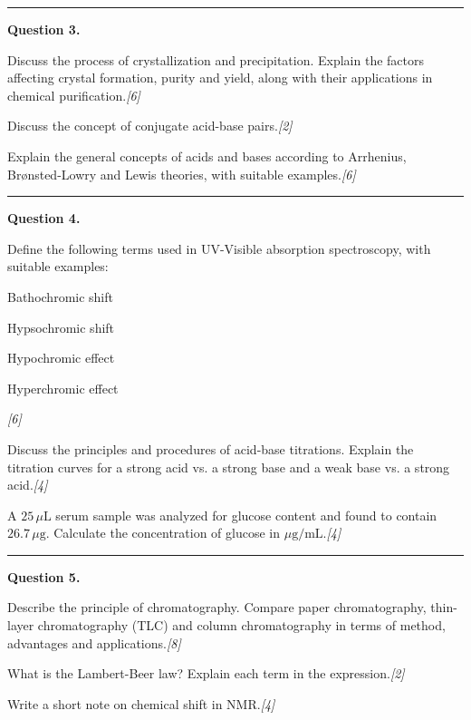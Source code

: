 \documentclass[11pt,a4paper]{article}
\newcommand{\pts}[1]{\hfill   \textit{[#1]}}
\begin{document}
\medskip\rule{\linewidth}{0.2pt}\medskip




\noindent   \textbf{Question 3.}

\begin{parts}
  \item Discuss the process of crystallization and precipitation. Explain the factors affecting crystal formation, purity and yield, along with their applications in chemical purification.\pts{6}
  \item Discuss the concept of conjugate acid-base pairs.\pts{2}
  \item Explain the general concepts of acids and bases according to Arrhenius, Br\o nsted-Lowry and Lewis theories, with suitable examples.\pts{6}
\end{parts}

\medskip\rule{\linewidth}{0.2pt}\medskip




\noindent   \textbf{Question 4.}

\begin{parts}
  \item Define the following terms used in UV-Visible absorption spectroscopy, with suitable examples:
  
\begin{parts}
    \item Bathochromic shift
    \item Hypsochromic shift
    \item Hypochromic effect
    \item Hyperchromic effect
  \end{parts}\pts{6}
  \item Discuss the principles and procedures of acid-base titrations. Explain the titration curves for a strong acid vs. a strong base and a weak base vs. a strong acid.\pts{4}
  \item A $25\,\mu \text{L}$ serum sample was analyzed for glucose content and found to contain $26.7\,\mu \text{g}$. Calculate the concentration of glucose in $\mu \text{g/mL}$.\pts{4}
\end{parts}

\medskip\rule{\linewidth}{0.2pt}\medskip




\noindent   \textbf{Question 5.}

\begin{parts}
  \item Describe the principle of chromatography. Compare paper chromatography, thin-layer chromatography (TLC) and column chromatography in terms of method, advantages and applications.\pts{8}
  \item What is the Lambert-Beer law? Explain each term in the expression.\pts{2}
  \item Write a short note on chemical shift in NMR.\pts{4}
\end{parts}
\end{document}
